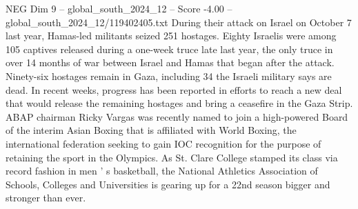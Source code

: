 \begin{textsample}{NEG Dim 9 – global\_south\_2024\_12 – Score -4.00 – global\_south\_2024\_12/119402405.txt}
During their attack on Israel on October 7 last year, Hamas-led militants seized 251 hostages.
Eighty Israelis were among 105 captives released during a one-week truce late last year, the only truce in over 14 months of war between Israel and Hamas that began after the attack.
Ninety-six hostages remain in Gaza, including 34 the Israeli military says are dead.
In recent weeks, progress has been reported in efforts to reach a new deal that would release the remaining hostages and bring a ceasefire in the Gaza Strip.
ABAP chairman Ricky Vargas was recently named to join a high-powered Board of the interim Asian Boxing that is affiliated with World Boxing, the international federation seeking to gain IOC recognition for the purpose of retaining the sport in the Olympics.
As St.
Clare College stamped its class via record fashion in men ' s basketball, the National Athletics Association of Schools, Colleges and Universities is gearing up for a 22nd season bigger and stronger than ever.

\end{textsample}
